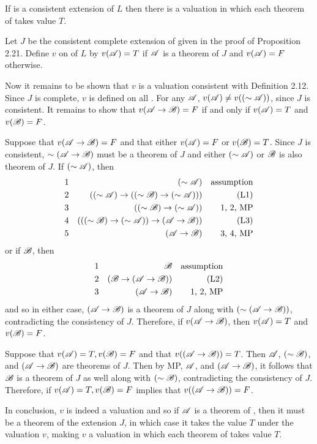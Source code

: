 \begin{proposition}
  If \Lext{} is a consistent extension of \(L\) then there is a valuation in which each theorem of \Lext{} takes value \(T\).

  \prf{} Let \(J\) be the consistent complete extension of \Lext{} given in the proof of Proposition 2.21. Define \(v\) on \wfs{} of \(L\) by \(v(\mathscr{A}) = T\) if \(\mathscr{A}\) is a theorem of \(J\) and \(v(\mathscr{A}) = F\) otherwise.

  Now it remains to be shown that \(v\) is a valuation consistent with Definition 2.12. Since \(J\) is complete, \(v\) is defined on all \wfs{}. For any \(\mathscr{A}\), \(v(\mathscr{A}) \neq v((\sim\mathscr{A}))\), since \(J\) is consistent. It remains to show that \(v(\mathscr{A} \rightarrow \mathscr{B}) = F\) if and only if \(v(\mathscr{A}) = T\) and \(v(\mathscr{B}) = F\).

  \Ra{} Suppose that \(v(\mathscr{A} \rightarrow \mathscr{B}) = F\) and that either \(v(\mathscr{A}) = F\) or \(v(\mathscr{B}) = T\). Since \(J\) is consistent, \(\sim(\mathscr{A} \rightarrow \mathscr{B})\) must be a theorem of \(J\) and either \((\sim\mathscr{A})\) or \(\mathscr{B}\) is also theorem of \(J\). If \((\sim\mathscr{A})\), then
  \begin{align*}
    \text{1}&&
    (\sim\mathscr{A})&&
    \text{assumption}\\
    \text{2}&&
    ((\sim\mathscr{A}) \rightarrow ((\sim\mathscr{B}) \rightarrow (\sim\mathscr{A})))&&
    \text{(L1)}\\
    \text{3}&&
    ((\sim\mathscr{B}) \rightarrow (\sim\mathscr{A}))&&
    \text{1, 2, MP}\\
    \text{4}&&
    (((\sim\mathscr{B}) \rightarrow (\sim\mathscr{A})) \rightarrow (\mathscr{A} \rightarrow \mathscr{B}))&&
    \text{(L3)}\\
    \text{5}&&
    (\mathscr{A} \rightarrow \mathscr{B})&&
    \text{3, 4, MP}
  \end{align*}
  or if \(\mathscr{B}\), then
  \begin{align*}
    \text{1}&&
    \mathscr{B}&&
    \text{assumption}\\
    \text{2}&&
    (\mathscr{B} \rightarrow (\mathscr{A} \rightarrow \mathscr{B}))&&
    \text{(L2)}\\
    \text{3}&&
    (\mathscr{A} \rightarrow \mathscr{B})&&
    \text{1, 2, MP}
  \end{align*}
  and so in either case, \((\mathscr{A} \rightarrow \mathscr{B})\) is a theorem of \(J\) along with \((\sim(\mathscr{A} \rightarrow \mathscr{B}))\), contradicting the consistency of \(J\). Therefore, if \(v(\mathscr{A} \rightarrow \mathscr{B})\), then \(v(\mathscr{A}) = T\) and \(v(\mathscr{B}) = F\).

  \La{} Suppose that \(v(\mathscr{A}) = T, v(\mathscr{B}) = F\) and that \(v((\mathscr{A} \rightarrow \mathscr{B})) = T\). Then \(\mathscr{A}\), \((\sim\mathscr{B})\), and \((\mathscr{A} \rightarrow \mathscr{B})\) are theorems of \(J\). Then by MP, \(\mathscr{A}\), and \((\mathscr{A} \rightarrow \mathscr{B})\), it follows that \(\mathscr{B}\) is a theorem of \(J\) as well along with \((\sim\mathscr{B})\), contradicting the consistency of \(J\). Therefore, if \(v(\mathscr{A}) = T, v(\mathscr{B}) = F\) implies that \(v((\mathscr{A} \rightarrow \mathscr{B})) = F\).

  In conclusion, \(v\) is indeed a valuation and so if \(\mathscr{A}\) is a theorem of \Lext{}, then it must be a theorem of the extension \(J\), in which case it takes the value \(T\) under the valuation \(v\), making \(v\) a valuation in which each theorem of \Lext{} takes value \(T\).
\end{proposition}

